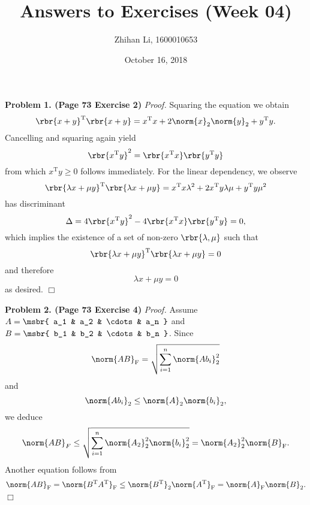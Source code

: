 \documentclass[english, nochinese]{pnote}
\title{Answers to Exercises (Week 04)}
\author{Zhihan Li, 1600010653}
\date{October 16, 2018}
\begin{document}
\maketitle

\textbf{Problem 1. (Page 73 Exercise 2)} \textit{Proof.} Squaring the equation we obtain
\begin{equation}
\rbr{ x + y }^{\text{T}} \rbr{ x + y } = x^{\text{T}} x + 2 \norm{x}_2 \norm{y}_2 + y^{\text{T}} y.
\end{equation}
Cancelling and squaring again yield
\begin{equation}
\rbr{ x^{\text{T}} y }^2 = \rbr{ x^{\text{T}} x } \rbr{ y^{\text{T}} y }
\end{equation}
from which $ x^{\text{T}} y \ge 0 $ follows immediately. For the linear dependency, we observe
\begin{equation}
\rbr{ \lambda x + \mu y }^{\text{T}} \rbr{ \lambda x + \mu y } = x^{\text{T}} x \lambda^2 + 2 x^{\text{T}} y \lambda \mu + y^{\text{T}} y \mu^2
\end{equation}
has discriminant
\begin{equation}
\Delta = 4 \rbr{ x^{\text{T}} y }^2 - 4 \rbr{ x^{\text{T}} x } \rbr{ y^{\text{T}} y } = 0,
\end{equation}
which implies the existence of a set of non-zero $ \rbr{ \lambda, \mu } $ such that
\begin{equation}
\rbr{ \lambda x + \mu y }^{\text{T}} \rbr{ \lambda x + \mu y } = 0
\end{equation}
and therefore
\begin{equation}
\lambda x + \mu y = 0
\end{equation}
as desired.
\hfill$\Box$

\textbf{Problem 2. (Page 73 Exercise 4)} \textit{Proof.} Assume $ A = \msbr{ a_1 & a_2 & \cdots & a_n } $ and $ B = \msbr{ b_1 & b_2 & \cdots & b_n } $. Since
\begin{equation}
\norm{ A B }_{\text{F}} = \sqrt{ \sum_{ i = 1 }^n \norm{ A b_i }_2^2 }
\end{equation}
and
\begin{equation}
\norm{ A b_i }_2 \le \norm{A}_2 \norm{b_i}_2,
\end{equation}
we deduce
\begin{equation}
\norm{ A B }_F \le \sqrt{ \sum_{ i = 1 }^n \norm{A_2}_2^2 \norm{b_i}_2^2 } = \norm{A_2}_2^2 \norm{B}_{\text{F}}.
\end{equation}
Another equation follows from
\begin{equation}
\norm{ A B }_{\text{F}} = \norm{ B^{\text{T}} A^{\text{T}} }_{\text{F}} \le \norm{B^{\text{T}}}_{2} \norm{A^{\text{T}}}_{\text{F}} = \norm{A}_{\text{F}} \norm{B}_2.
\end{equation}
\hfill$\Box$
\end{document}
